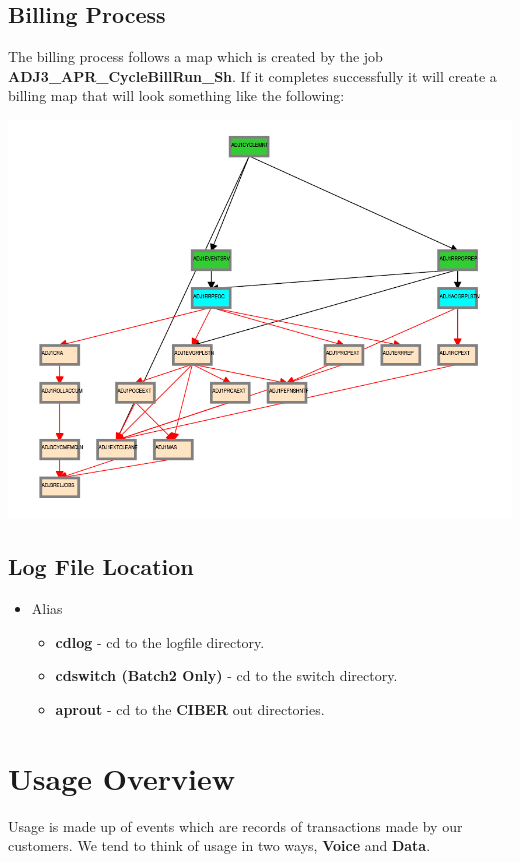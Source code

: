 \documentclass[12pt,twoside]{article}
\begin{document}
\subsection{Billing Process}
\label{sec:orgheadline15}
The billing process follows a map which is created by the job
\textbf{ADJ3\_APR\_CycleBillRun\_Sh}. If it completes successfully it
will create a billing map that will look something like the
following:

\includegraphics[width=.9\linewidth]{Pictures/billing_tc_map-27124108.png}

\subsection{Log File Location}
\label{sec:orgheadline16}
\begin{itemize}
\item Alias
\begin{itemize}
\item \textbf{cdlog} - cd to the logfile directory.
\item \textbf{cdswitch (Batch2 Only)} - cd to the switch directory.
\item \textbf{aprout} - cd to the \textbf{CIBER} out directories.
\end{itemize}
\end{itemize}
\newpage
\section{Usage Overview}
\label{sec:orgheadline29}
Usage is made up of events which are records of transactions made by our customers. We tend to think of usage
in two ways, \textbf{Voice} and \textbf{Data}.\\
\end{document}
